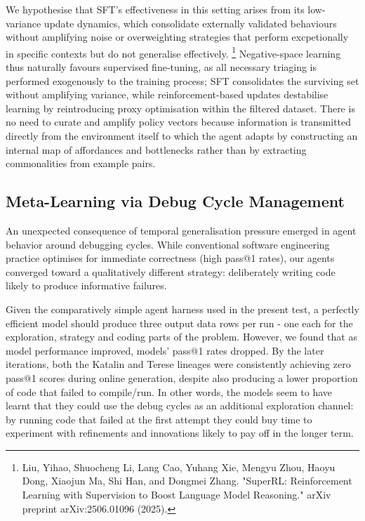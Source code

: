 \documentclass{article}
\begin{document}
 We hypothesise that SFT’s effectiveness in this setting arises from its low-variance update dynamics, which consolidate externally validated behaviours without amplifying noise or overweighting strategies that perform excpetionally in specific contexts but do not generalise effectively. \footnote{Liu, Yihao, Shuocheng Li, Lang Cao, Yuhang Xie, Mengyu Zhou, Haoyu Dong, Xiaojun Ma, Shi Han, and Dongmei Zhang. "SuperRL: Reinforcement Learning with Supervision to Boost Language Model Reasoning." arXiv preprint arXiv:2506.01096 (2025).} Negative-space learning thus naturally favours supervised fine-tuning, as all necessary triaging is performed exogenously to the training process; SFT consolidates the surviving set without amplifying variance, while reinforcement-based updates destabilise learning by reintroducing proxy optimisation within the filtered dataset. There is no need to curate and amplify policy vectors because information is transmitted directly from the environment itself to which the agent adapts by constructing an internal map of affordances and bottlenecks rather than by extracting commonalities from example pairs. 

\subsection{Meta-Learning via Debug Cycle Management}

An unexpected consequence of temporal generalisation pressure emerged in agent behavior around debugging cycles. While conventional software engineering practice optimises for immediate correctness (high pass@1 rates), our agents converged toward a qualitatively different strategy: deliberately writing code likely to produce informative failures. 

Given the comparatively simple agent harness used in the present test, a perfectly efficient model should produce three output data rows per run - one each for the exploration, strategy and coding parts of the problem. However, we found that as model performance improved, models’ pass@1 rates dropped. By the later iterations, both the Katalin and Terese lineages were consistently achieving zero pass@1 scores during online generation, despite also producing a lower proportion of code that failed to compile/run. In other words, the models seem to have learnt that they could use the debug cycles as an additional exploration channel: by running code that failed at the first attempt they could buy time to experiment with refinements and innovations likely to pay off in the longer term. 
\end{document}
